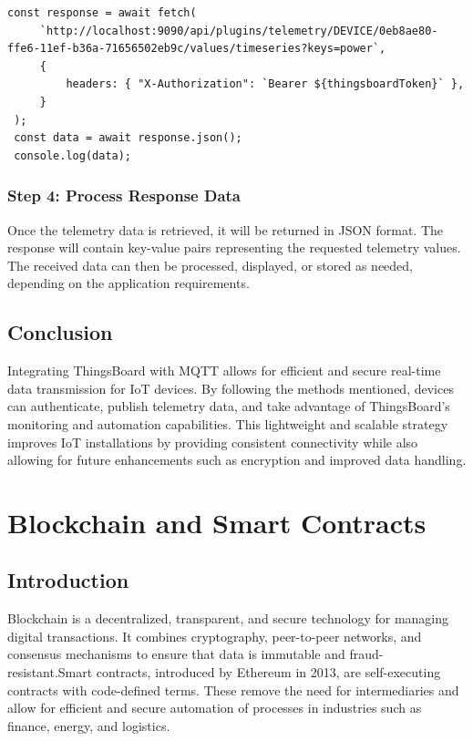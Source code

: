 \documentclass[a4paper,12pt]{report}
\begin{document}
 \begin{lstlisting}[caption={Fetching Data from ThingsBoard using Token Authentication method}]
 const response = await fetch( 
     `http://localhost:9090/api/plugins/telemetry/DEVICE/0eb8ae80-ffe6-11ef-b36a-71656502eb9c/values/timeseries?keys=power`,
     {
         headers: { "X-Authorization": `Bearer ${thingsboardToken}` },
     }
 );
 const data = await response.json();
 console.log(data);
 \end{lstlisting}
 
 \subsection{Step 4: Process Response Data}
 Once the telemetry data is retrieved, it will be returned in JSON format. The response will contain key-value pairs representing the requested telemetry values. The received data can then be processed, displayed, or stored as needed, depending on the application requirements.
 \section{Conclusion}
 Integrating ThingsBoard with MQTT allows for efficient and secure real-time data transmission for IoT devices. By following the methods mentioned, devices can authenticate, publish telemetry data, and take advantage of ThingsBoard's monitoring and automation capabilities. This lightweight and scalable strategy improves IoT installations by providing consistent connectivity while also allowing for future enhancements such as encryption and improved data handling.

 \chapter{Blockchain and Smart Contracts}

 \section{Introduction}
 Blockchain is a decentralized, transparent, and secure technology for managing digital transactions. It combines cryptography, peer-to-peer networks, and consensus mechanisms to ensure that data is immutable and fraud-resistant\cite{swan2016blockchain}\cite{tern2021survey}.Smart contracts, introduced by Ethereum in 2013, are self-executing contracts with code-defined terms. These remove the need for intermediaries and allow for efficient and secure automation of processes in industries such as finance, energy, and logistics\cite{yuan2018shadoweth}\cite{falazi2020smart}\cite{johari2021smart}.
 
\end{document}
